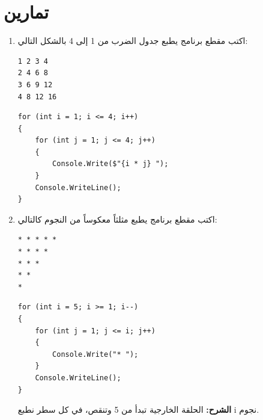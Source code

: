 \documentclass[14pt]{extarticle}
\begin{document}
\clearpage
\section{تمارين}
\begin{enumerate}[itemsep=2em]
    \item
    اكتب مقطع برنامج يطبع جدول الضرب من 1 إلى 4 بالشكل التالي:
    \begin{english}
    \begin{boxCode}
\begin{verbatim}
1 2 3 4
2 4 6 8
3 6 9 12
4 8 12 16
    \end{verbatim}
\end{boxCode}
    \end{english}
    \ifwithsols
    \begin{boxSolution}
    \begin{english}
    \begin{verbatim}
for (int i = 1; i <= 4; i++)
{
    for (int j = 1; j <= 4; j++)
    {
        Console.Write($"{i * j} ");
    }
    Console.WriteLine();
}
    \end{verbatim}
    \end{english}
    \end{boxSolution}
    \clearpage
    \fi

    \item
    اكتب مقطع برنامج يطبع مثلثاً معكوساً من النجوم كالتالي:
    \begin{english}
    \begin{boxCode}
\begin{verbatim}
* * * * *
* * * *
* * *
* *
*
    \end{verbatim}
\end{boxCode}
    \end{english}
    \ifwithsols
    \begin{boxSolution}
    \begin{english}
    \begin{verbatim}
for (int i = 5; i >= 1; i--)
{
    for (int j = 1; j <= i; j++)
    {
        Console.Write("* ");
    }
    Console.WriteLine();
}
    \end{verbatim}
    \end{english}
    \textbf{الشرح:} الحلقة الخارجية تبدأ من 5 وتنقص، في كل سطر نطبع \textenglish{i} نجوم.
    \end{boxSolution}
    \clearpage
    \fi


\end{enumerate}
\end{document}
